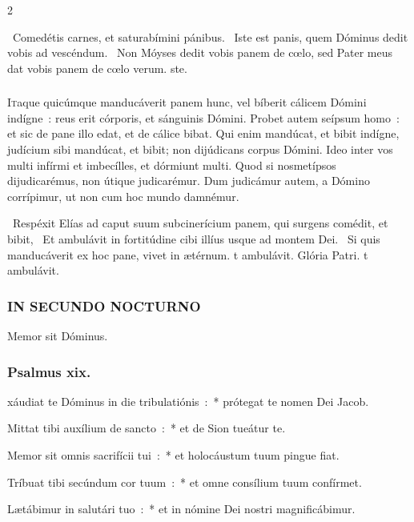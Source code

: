 \documentclass[9pt,twoside]{extarticle}
\begin{document}
\begin{multicols}{2}
\begin{tightlist}{}
\item {}~Comedétis carnes, et saturabímini pánibus. \textred{*}~Iste est panis, quem Dóminus dedit vobis ad vescéndum. ~Non Móyses dedit vobis panem de cœlo, sed Pater meus dat vobis panem de cœlo verum. ste.
\end{tightlist}

\subsubsection*{\center{}}
\lettrine{I}taque quicúmque manducáverit panem hunc, vel bíberit cálicem Dómini indígne~: reus erit córporis, et sánguinis Dómini. Probet autem seípsum homo~: et sic de pane illo edat, et de cálice bibat. Qui enim mandúcat, et bibit indígne, judícium sibi mandúcat, et bibit; non dijúdicans corpus Dómini. Ideo inter vos multi infírmi et imbecílles, et dórmiunt multi. Quod si nosmetípsos dijudicarémus, non útique judicarémur. Dum judicámur autem, a Dómino corrípimur, ut non cum hoc mundo damnémur.

\begin{tightlist}{}
\item {}~Respéxit Elías ad caput suum subcinerícium panem, qui surgens comédit, et bibit, \textred{*}~Et ambulávit in fortitúdine cibi illíus usque ad montem Dei. ~Si quis manducáverit ex hoc pane, vivet in ætérnum. t ambulávit. Glória Patri. t ambulávit.
\end{tightlist}

\subsubsection*{\center \textsc{IN SECUNDO NOCTURNO}}
 Memor sit Dóminus.
\subsubsection*{\center Psalmus xix.}
xáudiat te Dóminus in die tribulatiónis~:~* prótegat te nomen Dei Jacob.

Mittat tibi auxílium de sancto~:~* et de Sion tueátur te.

Memor sit omnis sacrifícii tui~:~* et holocáustum tuum pingue fiat.

Tríbuat tibi secúndum cor tuum~:~* et omne consílium tuum confírmet.

Lætábimur in salutári tuo~:~* et in nómine Dei nostri magnificábimur.


\end{multicols}
\end{document}
